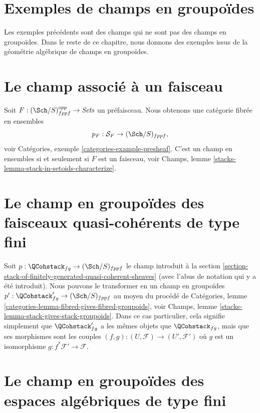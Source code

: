 \section{Exemples de champs en groupoïdes}
\label{section-examples-stacks-in-groupoids}

\noindent
Les exemples précédents sont des champs qui ne sont pas des champs en
groupoïdes. Dans le reste de ce chapitre, nous donnons
des exemples issus de la géométrie algébrique de champs en groupoïdes.



\section{Le champ associé à un faisceau}
\label{section-stack-associated-to-sheaf}

\noindent
Soit $F : (\Sch/S)_{fppf}^{opp} \to \textit{Sets}$ un préfaisceau.
Nous obtenons une catégorie fibrée en ensembles
$$
p_F : \mathcal{S}_F \to (\Sch/S)_{fppf},
$$
voir
Catégories, exemple \ref{categories-example-presheaf}.
C'est un champ en ensembles si et seulement si $F$ est un faisceau, voir
Champs, lemme \ref{stacks-lemma-stack-in-setoids-characterize}.



\section{Le champ en groupoïdes des faisceaux quasi-cohérents de type fini}
\label{section-stack-in-groupoids-of-quasi-coherent-sheaves}

\noindent
Soit $p : \QCohstack_{fg} \to (\Sch/S)_{fppf}$ le champ
introduit à la
section \ref{section-stack-of-finitely-generated-quasi-coherent-sheaves}
(avec l'abus de notation qui y a été introduit).
Nous pouvons le transformer en un champ en groupoïdes
$p' : \QCohstack_{fg}' \to (\Sch/S)_{fppf}$ au moyen
du procédé de
Catégories, lemme \ref{categories-lemma-fibred-gives-fibred-groupoids},
voir
Champs, lemme \ref{stacks-lemma-stack-gives-stack-groupoids}.
Dans ce cas particulier, cela signifie simplement que $\QCohstack_{fg}'$ a
les mêmes objets que $\QCohstack_{fg}$, mais que ses morphismes sont les
couples $(f, g) : (U, \mathcal{F}) \to (U', \mathcal{F}')$
où $g$ est un isomorphisme $g : f^*\mathcal{F}' \to \mathcal{F}$.


\section{Le champ en groupoïdes des espaces algébriques de type fini}
\label{section-stack-in-groupoids-of-finite-type-spaces}

